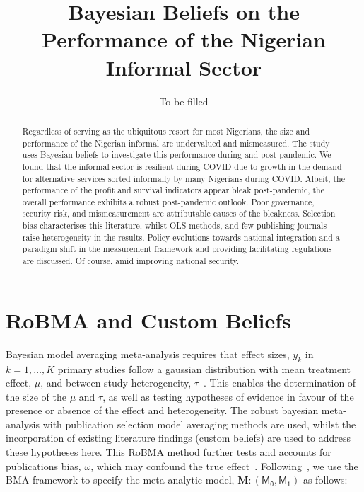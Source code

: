 \documentclass[12pt, english]{article}
\title{Bayesian Beliefs on the Performance of the Nigerian Informal Sector}
\author{To be filled}
\begin{document}
    \maketitle
    \newpage
    \tableofcontents

    \newpage
    \begin{abstract}
        Regardless of serving as the ubiquitous resort for most Nigerians, the size and performance of the Nigerian informal are undervalued and mismeasured. The study uses Bayesian beliefs to investigate this performance during and post-pandemic. We found that the informal sector is resilient during COVID due to growth in the demand for alternative services sorted informally by many Nigerians during COVID. Albeit, the performance of the profit and survival indicators appear bleak post-pandemic, the overall performance exhibits a robust post-pandemic outlook. Poor governance, security risk, and mismeasurement are attributable causes of the bleakness. Selection bias characterises this literature, whilst OLS methods, and few publishing journals raise heterogeneity in the results. Policy evolutions towards national integration and a paradigm shift in the measurement framework and providing facilitating regulations are discussed. Of course, amid improving national security.
    \end{abstract}


    \section{RoBMA and Custom Beliefs}\label{sec2.3:robma-custom-beliefs}
    Bayesian model averaging meta-analysis requires that effect sizes, $y_k$ in $k = 1, \dots, K$ primary studies follow a gaussian distribution with mean treatment effect, $\mu$, and between-study heterogeneity, $\tau$~\parencite{bartos2021bma}. This enables the determination of the size of the $\mu$ and $\tau$, as well as testing hypotheses of evidence in favour of the presence or absence of the effect and heterogeneity. The robust bayesian meta-analysis with publication selection model averaging methods are used, whilst the incorporation of existing literature findings (custom beliefs) are used to address these hypotheses here. This RoBMA method further tests and accounts for publications bias, $\omega$, which may confound the true effect~\parencite{maier2022, bartos2021}. Following~\parencite{maier2022, bartos2021}, we use the BMA framework to specify the meta-analytic model, $\mathbf{M}: (\mathsf{M_0}, \mathsf{M_1})$ as follows:
\end{document}
